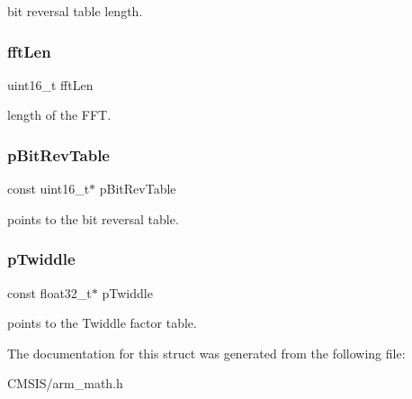 bit reversal table length. \mbox{\label{structarm__cfft__instance__f32_ab8db3bbe7c61e6bb8ca2a55e3446e11a}} 
\subsubsection{\texorpdfstring{fftLen}{fftLen}}
{\footnotesize\ttfamily uint16\+\_\+t fft\+Len}

length of the F\+FT. \mbox{\label{structarm__cfft__instance__f32_a3b229432d381b0a511a9cdbe3aa74e78}} 
\subsubsection{\texorpdfstring{pBitRevTable}{pBitRevTable}}
{\footnotesize\ttfamily const uint16\+\_\+t$\ast$ p\+Bit\+Rev\+Table}

points to the bit reversal table. \mbox{\label{structarm__cfft__instance__f32_a8292d9775f5c5472f59915649fe3b378}} 
\subsubsection{\texorpdfstring{pTwiddle}{pTwiddle}}
{\footnotesize\ttfamily const float32\+\_\+t$\ast$ p\+Twiddle}

points to the Twiddle factor table. 

The documentation for this struct was generated from the following file\+:\begin{DoxyCompactItemize}
\item 
C\+M\+S\+I\+S/arm\+\_\+math.\+h\end{DoxyCompactItemize}
